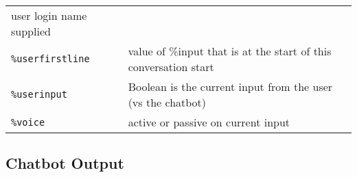 \documentclass[]{article}
\begin{document}
\begin{longtable}[]{@{}ll@{}}
\begin{minipage}[t]{0.10\columnwidth}
user login name supplied\strut
\end{minipage}\tabularnewline
\begin{minipage}[t]{0.12\columnwidth}\raggedright\strut
\texttt{\%userfirstline}\strut
\end{minipage} & \begin{minipage}[t]{0.10\columnwidth}\raggedright\strut
value of \%input that is at the start of this conversation start\strut
\end{minipage}\tabularnewline
\begin{minipage}[t]{0.12\columnwidth}\raggedright\strut
\texttt{\%userinput}\strut
\end{minipage} & \begin{minipage}[t]{0.10\columnwidth}\raggedright\strut
Boolean is the current input from the user (vs the chatbot)\strut
\end{minipage}\tabularnewline
\begin{minipage}[t]{0.12\columnwidth}\raggedright\strut
\texttt{\%voice}\strut
\end{minipage} & \begin{minipage}[t]{0.10\columnwidth}\raggedright\strut
active or passive on current input\strut
\end{minipage}\tabularnewline
\bottomrule
\end{longtable}

\subsection{Chatbot Output}\label{chatbot-output}
\end{document}
